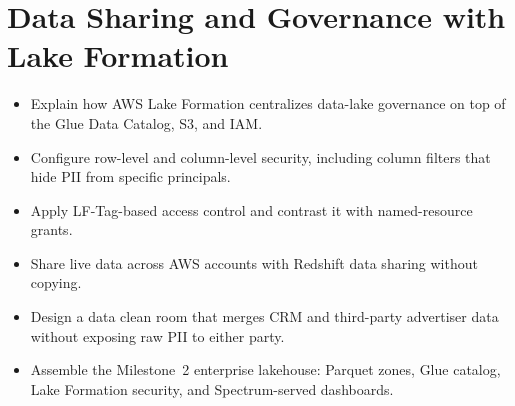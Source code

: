 \chapter{Data Sharing and Governance with Lake Formation}
%
\begin{objectives}
\begin{itemize}
    \item Explain how AWS Lake Formation centralizes data-lake governance on top of the Glue Data Catalog, S3, and IAM.
    \item Configure row-level and column-level security, including column filters that hide PII from specific principals.
    \item Apply LF-Tag-based access control and contrast it with named-resource grants.
    \item Share live data across AWS accounts with Redshift data sharing without copying.
    \item Design a data clean room that merges CRM and third-party advertiser data without exposing raw PII to either party.
    \item Assemble the Milestone~2 enterprise lakehouse: Parquet zones, Glue catalog, Lake Formation security, and Spectrum-served dashboards.
\end{itemize}
\end{objectives}

